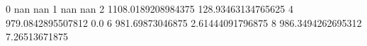0 nan nan
1 nan nan
2 1108.0189208984375 128.93463134765625
4 979.0842895507812 0.0
6 981.69873046875 2.61444091796875
8 986.3494262695312 7.26513671875
